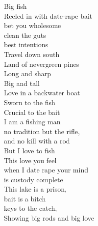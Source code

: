 Big fish\\
Reeled in with date-rape bait\\
bet you wholesome\\
clean the guts\\
best intentions\\
Travel down south\\
Land of nevergreen pines\\
Long and sharp\\
Big and tall\\
Love in a backwater boat\\
Sworn to the fish\\
Crucial to the bait\\
I am a fishing man\\
no tradition but the rifle,\\
and no kill with a rod\\
But I love to fish\\
This love you feel\\
when I date rape your mind\\
is custody complete\\
This lake is a prison,\\
bait is a bitch\\
keys to the catch,\\
Showing big rods and big love\\

